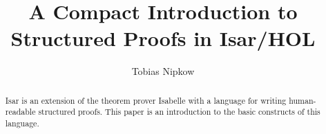 \documentclass[envcountsame]{llncs}
\newcommand{\tweakskip}{\vspace{-\medskipamount}}
\newcommand{\Tweakskip}{\tweakskip\tweakskip}
\begin{document}
\title{A Compact Introduction to Structured Proofs in Isar/HOL}
\author{Tobias Nipkow}
\date{}
\maketitle

\begin{abstract}
  Isar is an extension of the theorem prover Isabelle with a language
  for writing human-readable structured proofs. This paper is an
  introduction to the basic constructs of this language.
\end{abstract}



\Tweakskip\Tweakskip


\Tweakskip
\Tweakskip
\begingroup
 \small\raggedright\frenchspacing

\endgroup
\end{document}
